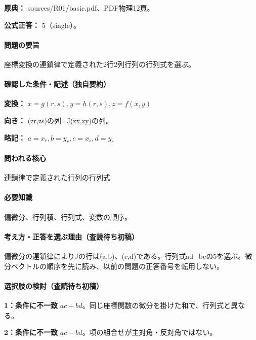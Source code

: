 \noindent\textbf{原典：} sources/R01/basic.pdf、PDF物理12頁。

\textbf{公式正答：} 5（single）。

\paragraph{問題の要旨} 座標変換の連鎖律で定義された2行2列行列の行列式を選ぶ。

\paragraph{確認した条件・記述（独自要約）}\mbox{}\par

\noindent\textbf{変換：} \(x=g(r,s),y=h(r,s),z=f(x,y)\)\par

\noindent\textbf{向き：} (zr,zs)の列=J(zx,zy)の列。\par

\noindent\textbf{略記：} \(a=x_r,b=y_r,c=x_s,d=y_s\)\par

\paragraph{問われる核心} 連鎖律で定義された行列の行列式

\paragraph{必要知識} 偏微分、行列積、行列式、変数の順序。

\paragraph{考え方・正答を選ぶ理由（査読待ち初稿）} 偏微分の連鎖律によりJの行は(a,b)、(c,d)である。行列式ad−bcの5を選ぶ。微分ベクトルの順序を先に読み、以前の問題の正答番号を転用しない。

\paragraph{選択肢の検討（査読待ち初稿）}\mbox{}\par

\noindent\textbf{1：条件に不一致} \(ac+bd\)。同じ座標関数の微分を掛けた和で、行列式と異なる。\par

\noindent\textbf{2：条件に不一致} \(ac-bd\)。項の組合せが主対角・反対角ではない。\par

